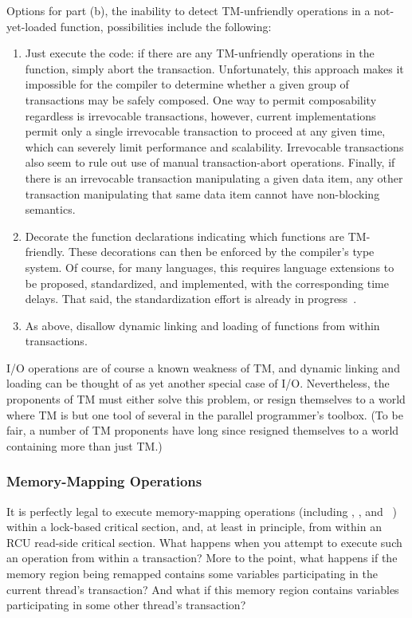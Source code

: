 Options for part (b), the inability to detect TM-unfriendly operations
in a not-yet-loaded function, possibilities include the following:

\begin{enumerate}
\item	Just execute the code: if there are any TM-unfriendly operations
	in the function, simply abort the transaction.
	Unfortunately, this approach makes it impossible for the compiler
	to determine whether a given group of transactions may be safely
	composed.
	One way to permit composability regardless is irrevocable
	transactions, however, current implementations permit only a
	single irrevocable transaction to proceed at any given time,
	which can severely limit performance and scalability.
	Irrevocable transactions also seem to rule out use of manual
	transaction-abort operations.
	Finally, if there is an irrevocable transaction manipulating
	a given data item, any other transaction manipulating that
	same data item cannot have non-blocking semantics.
\item	Decorate the function declarations indicating which functions
	are TM-friendly.
	These decorations can then be enforced by the compiler's type system.
	Of course, for many languages, this requires language extensions
	to be proposed, standardized, and implemented, with the
	corresponding time delays.
	That said, the standardization effort is already in
	progress~\cite{Ali-Reza-Adl-Tabatabai2009CppTM}.
\item	As above, disallow dynamic linking and loading of functions from
	within transactions.
\end{enumerate}

I/O operations are of course a known weakness of TM, and dynamic linking
and loading can be thought of as yet another special case of I/O.
Nevertheless, the proponents of TM must either solve this problem, or
resign themselves to a world where TM is but one tool of several in the
parallel programmer's toolbox.
(To be fair, a number of TM proponents have long since resigned themselves
to a world containing more than just TM.)

\subsubsection{Memory-Mapping Operations}
\label{sec:future:Memory-Mapping Operations}

It is perfectly legal to execute memory-mapping operations (including
, , and ~\cite{TheOpenGroup1997SUS})
within a lock-based critical section,
and, at least in principle, from within an RCU read-side critical section.
What happens when you attempt to execute such an operation from within
a transaction?
More to the point, what happens if the memory region being remapped
contains some variables participating in the current thread's transaction?
And what if this memory region contains variables participating in some
other thread's transaction?

